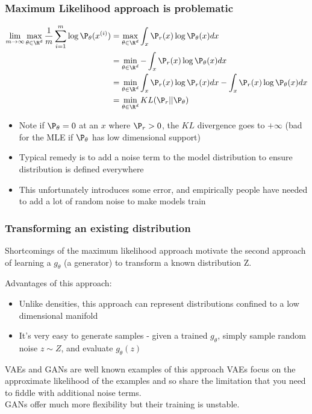 \documentclass{beamer}
\begin{document}
\begin{frame}
\frametitle{Maximum Likelihood approach is problematic}
\vspace{-15pt}
\begin{align*}
\lim_{m \to \infty} \max_{\theta \in \R^d} \frac{1}{m} \sum_{i=1}^{m} \log \P_{\theta}(x^{(i)}) &= \max_{\theta \in \R^d} \int_{x} \P_{r}(x) \log \P_{\theta}(x) dx \\
&= \min_{\theta \in \R^d} - \int_{x} \P_{r}(x) \log \P_{\theta}(x) dx \\
&= \min_{\theta \in \R^d} \int_{x} \P_{r}(x) \log \P_{r}(x) dx - \int_{x} \P_{r}(x) \log \P_{\theta}(x) dx \\
&= \min_{\theta \in \R^d} KL(\P_{r}||\P_{\theta})
\end{align*}

\begin{itemize}
\pause
\item{Note if $\P_{\theta} = 0$ at an $x$ where $\P_{r} > 0$, the $KL$ divergence goes to $+\infty$ (bad for the MLE if $\P_{\theta}$ has low dimensional support)}
\vspace{2.5pt}
\pause
\item{Typical remedy is to add a noise term to the model distribution to ensure distribution is defined everywhere}
\vspace{2.5pt}
\pause
\item{This unfortunately introduces some error, and empirically people have needed to add a lot of random noise to make models train}
\end{itemize}
\end{frame}

\begin{frame}
\frametitle{Transforming an existing distribution}

Shortcomings of the maximum likelihood approach motivate the second approach of learning a $g_{\theta}$ (a generator) to transform a known distribution Z.
\vspace{5pt}

Advantages of this approach:
\pause
\begin{itemize}
\item{Unlike densities, this approach can represent distributions confined to a low dimensional manifold}
\pause
\item{It's very easy to generate samples - given a trained $g_{\theta}$, simply sample random noise $z \sim Z$, and evaluate $g_{\theta}(z)$}
\end{itemize}
\pause
\begin{block} {VAEs and GANs are well known examples of this approach}
VAEs focus on the approximate likelihood of the examples and so share the limitation that you need to fiddle with additional noise terms. \\
\vspace{2.5pt}
\pause
GANs offer much more flexibility but their training is unstable.
\end{block}
\end{frame}
\end{document}
